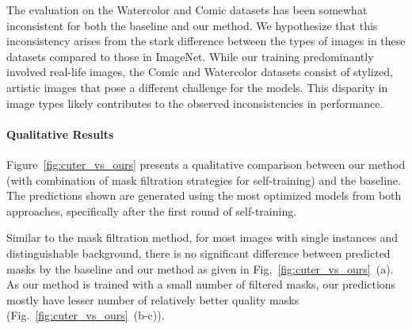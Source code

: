 The evaluation on the Watercolor and Comic datasets has been somewhat inconsistent for both the baseline and our method. We hypothesize that this inconsistency arises from the stark difference between the types of images in these datasets compared to those in ImageNet. While our training predominantly involved real-life images, the Comic and Watercolor datasets consist of stylized, artistic images that pose a different challenge for the models. This disparity in image types likely contributes to the observed inconsistencies in performance.

\paragraph{Qualitative Results}

Figure~\ref{fig:cuter_vs_ours} presents a qualitative comparison between our method (with combination of mask filtration strategies for self-training) and the baseline. The predictions shown are generated using the most optimized models from both approaches, specifically after the first round of self-training.

Similar to the mask filtration method, for most images with single instances and distinguishable background, there is no significant difference between predicted masks by the baseline and our method as given in Fig.~\ref{fig:cuter_vs_ours}~(a). As our method is trained with a small number of filtered masks, our predictions mostly have lesser number of relatively better quality masks (Fig.~\ref{fig:cuter_vs_ours}~(b-c)). 

